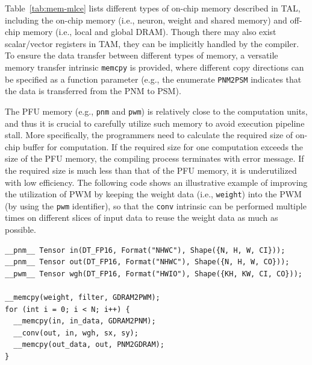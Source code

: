 Table~\ref{tab:mem-mlce} lists different types of on-chip memory described in TAL, including the on-chip memory (i.e., neuron, weight and shared memory) and off-chip memory (i.e., local and global DRAM). Though there may also exist scalar/vector registers in TAM, they can be implicitly handled by the compiler. To ensure the data transfer between different types of memory, a versatile memory transfer intrinsic \texttt{memcpy} is provided, where different copy directions can be specified as a function parameter (e.g., the enumerate \texttt{PNM2PSM} indicates that the data is transferred from the PNM to PSM).

The PFU memory (e.g., \texttt{pnm} and \texttt{pwm}) is relatively close to the computation units, and thus it is crucial to carefully utilize such memory to avoid execution pipeline stall. More specifically, the programmers need to calculate the required size of on-chip buffer for computation. If the required size for one computation exceeds the size of the PFU memory, the compiling process terminates with error message. If the required size is much less than that of the PFU memory, it is underutilized with low efficiency. The following code shows an illustrative example of improving the utilization of PWM by keeping the weight data (i.e., \texttt{weight}) into the PWM (by using the \texttt{pwm} identifier), so that the \texttt{conv} intrinsic can be performed multiple times on different slices of input data to reuse the weight data as much as possible. %

\vspace{-8pt}
\begin{scriptsize}
\begin{verbatim}
__pnm__ Tensor in(DT_FP16, Format("NHWC"), Shape({N, H, W, CI}));
__pnm__ Tensor out(DT_FP16, Format("NHWC"), Shape({N, H, W, CO}));
__pwm__ Tensor wgh(DT_FP16, Format("HWIO"), Shape({KH, KW, CI, CO}));

__memcpy(weight, filter, GDRAM2PWM);
for (int i = 0; i < N; i++) {
  __memcpy(in, in_data, GDRAM2PNM);
  __conv(out, in, wgh, sx, sy);
  __memcpy(out_data, out, PNM2GDRAM);
}
\end{verbatim}
\end{scriptsize}
\vspace{-8pt}


